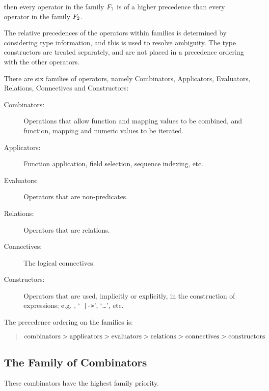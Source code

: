 \documentclass[\pformat,12pt]{article}
\begin{document}
\noindent then every operator in the family $F\sb{1}$ is of a higher precedence
than every operator in the family $F\sb{2}$.

The relative precedences of the operators within families is determined by
considering type information, and this is used to resolve ambiguity. The
type constructors are treated separately, and are not placed in a
precedence ordering with the other operators.

There are six families of operators, namely Combinators, Applicators,
Evaluators, Relations, Connectives and Constructors:

\begin{description}%
\item[Combinators:] Operations that allow function and mapping values to be
  combined, and function, mapping and numeric values to be iterated.

\item[Applicators:] Function application, field selection, sequence
  indexing, etc.

\item[Evaluators:] Operators that are non-predicates.

\item[Relations:] Operators that are relations.

\item[Connectives:] The logical connectives.

\item[Constructors:] Operators that are used, implicitly or explicitly, in
  the construction of expressions; e.g.  , `{\tt
    |->}', `\ldots', etc.
\end{description}

\noindent The precedence ordering on the families is:

\begin{quote}
$\mbox{\small combinators} >
\mbox{\small applicators} >
\mbox{\small evaluators}  >
\mbox{\small relations}   >
\mbox{\small connectives} >
\mbox{\small constructors}$
\end{quote}

\subsection{The Family of Combinators}

These combinators have the highest family priority.

\end{document}
